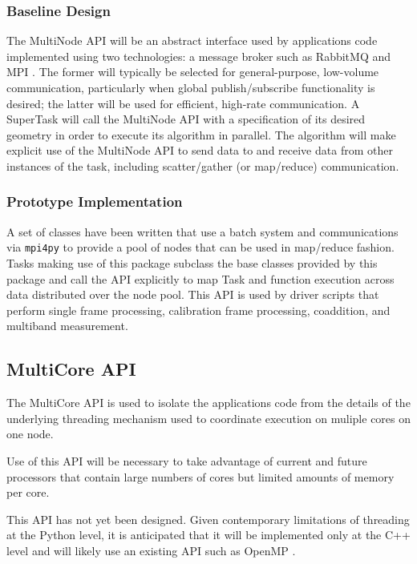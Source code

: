 \documentclass[DM,toc]{lsstdoc}
\begin{document}
\subsubsection{Baseline Design}\label{multinode-design}

The MultiNode API will be an abstract interface used by applications code
implemented using two technologies: a message broker such as RabbitMQ
\citep{RabbitMQ} and MPI \citep{MPI}. The former will typically be selected for
general-purpose, low-volume communication, particularly when global
publish/subscribe functionality is desired; the latter will be used for
efficient, high-rate communication. A SuperTask will call the MultiNode API
with a specification of its desired geometry in order to execute its algorithm
in parallel. The algorithm will make explicit use of the MultiNode API to send
data to and receive data from other instances of the task, including
scatter/gather (or map/reduce) communication.

\subsubsection{Prototype Implementation}\label{multinode-implementation}

A set of classes have been written that use a batch system and communications
via \texttt{mpi4py} \citep{mpi4py} to provide a pool of nodes that can be used
in map/reduce fashion.  Tasks making use of this package subclass the base
classes provided by this package and call the API explicitly to map Task and
function execution across data distributed over the node pool.  This API is
used by driver scripts that perform single frame processing, calibration frame
processing, coaddition, and multiband measurement.


\subsection{MultiCore API}\label{multicore-api}

The MultiCore API is used to isolate the applications code from the details of
the underlying threading mechanism used to coordinate execution on muliple
cores on one node.

Use of this API will be necessary to take advantage of current and future
processors that contain large numbers of cores but limited amounts of memory
per core.

This API has not yet been designed.  Given contemporary limitations of
threading at the Python level, it is anticipated that it will be implemented
only at the C++ level and will likely use an existing API such as OpenMP
\citep{OpenMP}.
\end{document}
